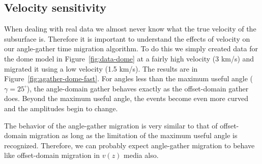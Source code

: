 
\subsection{Velocity sensitivity}

When dealing with real data we almost never know what the true velocity of 
the subsurface is.  Therefore it is important to understand the effects of
velocity on our angle-gather time migration algorithm.  To do this we
simply created data for the dome model in Figure~\ref{fig:data-dome} at a
fairly high velocity (3 km/s) and migrated it using a low velocity (1.5 km/s).
The results are in Figure~\ref{fig:agather-dome-fast}.  For angles less
than the maximum useful angle ($\gamma=25^{\circ}$), the angle-domain gather
behaves exactly as the offset-domain gather does.  Beyond the maximum
useful angle, the events become even more curved and the amplitudes begin
to change.

The behavior of the angle-gather migration is very similar to that of 
offset-domain migration as long as the limitation of the maximum useful
angle is recognized.  Therefore, we can probably expect angle-gather
migration to behave like offset-domain migration in $v(z)$ media also.  

